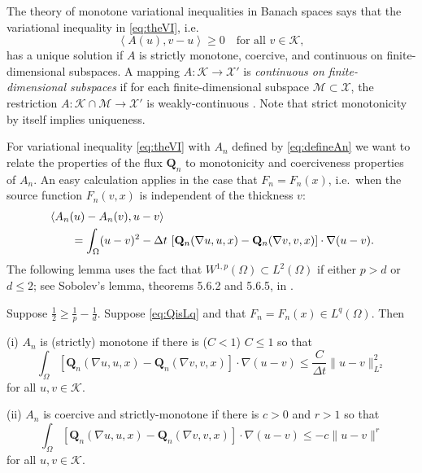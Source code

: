 \documentclass[final,leqno,onefignum,onetabnum]{siamltex1213bueler}
\newcommand\bQ{\mathbf{Q}}
\renewcommand{\grad}{\nabla}
\newcommand{\ip}[2]{\ensuremath{\left<#1,#2\right>}}
\begin{document}
The theory of monotone variational inequalities in Banach spaces \cite[chapter III]{KinderlehrerStampacchia1980} says that the variational inequality in \eqref{eq:theVI}, i.e.
\begin{equation}
    \ip{A(u)}{v-u} \ge 0 \quad \text{for all $v\in\mathcal{K}$}, \label{eq:VIabstract}
\end{equation}
has a unique solution if $A$ is strictly monotone, coercive, and continuous on finite-dimensional subspaces.  A mapping $A : \mathcal{K} \to \mathcal{X}'$ is \emph{continuous on finite-dimensional subspaces} if for each finite-dimensional subspace $\mathcal{M} \subset \mathcal{X}$, the restriction $A : \mathcal{K}\cap \mathcal{M} \to \mathcal{X}'$ is weakly-continuous \cite{KinderlehrerStampacchia1980}.  Note that strict monotonicity by itself implies uniqueness.

For variational inequality \eqref{eq:theVI} with $A_n$ defined by \eqref{eq:defineAn} we want to relate the properties of the flux $\bQ_n$ to monotonicity and coerciveness properties of $A_n$.  An easy calculation applies in the case that $F_n=F_n(x)$, i.e.~when the source function $F_n(v,x)$ is independent of the thickness $v$:
\begin{align}
   &\ip{A_n(u) - A_n(v)}{u-v}  \label{eq:AtoQcalculation} \\
   &\qquad = \int_\Omega (u-v)^2 - \Delta t\, \left[\bQ_n(\grad u,u,x) - \bQ_n(\grad v,v,x)\right] \cdot \grad(u-v).  \notag
\end{align}
The following lemma uses the fact that $W^{1,p}(\Omega) \subset L^2(\Omega)$ if either $p>d$ or $d\le 2$; see Sobolev's lemma, theorems 5.6.2 and 5.6.5, in \cite{Evans1998}.

\begin{lemma}  \label{lem:monotonecoercive}  Suppose $\frac{1}{2} \ge \frac{1}{p} - \frac{1}{d}$.  Suppose \eqref{eq:QisLq} and that $F_n=F_n(x) \in L^q(\Omega)$.  Then

(i)  $A_n$ is (strictly) monotone if there is ($C<1$) $C\le 1$ so that
\begin{equation}
\int_\Omega \left[\bQ_n(\grad u,u,x) - \bQ_n(\grad v,v,x)\right] \cdot \grad(u-v) \le \frac{C}{\Delta t} \|u-v\|_{L^2}^2 \label{eq:Qnmonotone}
\end{equation}
for all $u,v \in \mathcal{K}$.

(ii)  $A_n$ is coercive and strictly-monotone if there is $c>0$ and $r>1$ so that
\begin{equation}
\int_\Omega \left[\bQ_n(\grad u,u,x) - \bQ_n(\grad v,v,x)\right] \cdot \grad(u-v) \le - c \|u-v\|^r \label{eq:Qncoercive}
\end{equation}
for all $u,v \in \mathcal{K}$.
\end{lemma}
\end{document}
